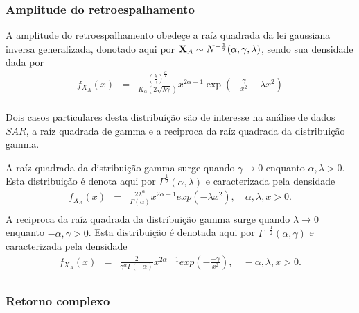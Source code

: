 \documentclass[12pt,a4paper]{article}
\begin{document}
\subsubsection{Amplitude do retroespalhamento}

A amplitude do retroespalhamento obedeçe a raíz quadrada da lei gaussiana inversa generalizada, donotado aqui por ${\bf X}_{A}\sim N^{-\frac{1}{2}}(\alpha,\gamma,\lambda)$, sendo sua densidade dada por
\begin{equation}\label{sec62eqn1}
\begin{array}{ccc}
	f_{X_{A}}(x)&=&\frac{\left(\frac{\lambda}{\gamma}\right)^{\frac{\alpha}{2}}}{K_{\alpha}(2\sqrt{\lambda\gamma})}x^{2\alpha-1}\exp\left(-\frac{\gamma}{x^2}-\lambda x^2\right) \\
\end{array}
\end{equation}

Dois casos particulares desta distribuíção são de interesse na análise de dados $SAR$, a raíz quadrada de gamma e a reciproca da raíz quadrada da distribuição gamma. 

A raíz quadrada da distribuição gamma surge quando $\gamma \rightarrow 0$ enquanto $\alpha,\lambda>0$. Esta distribuição é denota aqui por $\Gamma^{\frac{1}{2}}(\alpha,\lambda)$ e caracterizada pela densidade 
\begin{equation}\label{sec62eqn2}
\begin{array}{ccc}
	f_{X_{A}}(x)&=&\frac{2\lambda^{\alpha}}{\Gamma(\alpha)}x^{2\alpha-1}exp(-\lambda x^2), \quad \alpha,\lambda, x>0. \\
\end{array}
\end{equation}
A reciproca da raíz quadrada da distribuição gamma surge quando $\lambda\rightarrow 0$ enquanto $-\alpha,\gamma>0$. Esta distribuição é denotada aqui por $\Gamma^{-\frac{1}{2}}(\alpha,\gamma) $ e caracterizada pela densidade
\begin{equation}\label{sec62eqn3}
\begin{array}{ccc}
	f_{X_{A}}(x)&=&\frac{2}{\gamma^{\alpha}\Gamma(-\alpha)}x^{2\alpha-1}exp(-\frac{-\gamma}{x^2}), \quad -\alpha,\lambda, x>0. \\
\end{array}
\end{equation}

\subsubsection{Retorno complexo}
\end{document}
